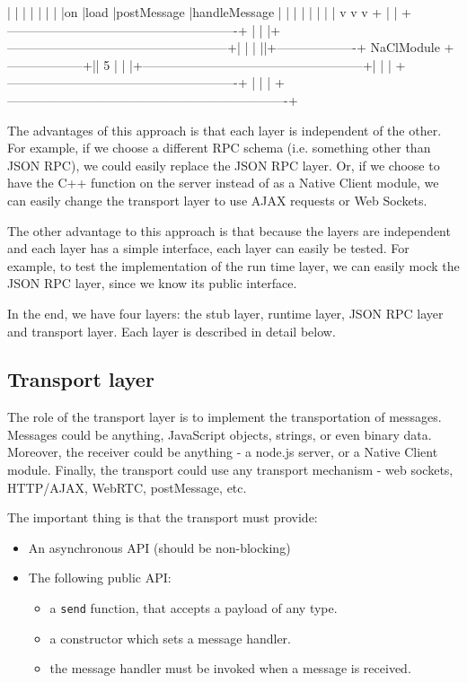 \begin{code}
|         |        |       |                |                       |
|         |on      |load   |postMessage     |handleMessage          |
|         |        |       |                |                       |
|         v        v       v                +                       |
|     +-------------------------------------------------------+     |
|     |+-----------------------------------------------------+|     |
|     ||+-------------------+ NaClModule +------------------+|| 5   |
|     |+-----------------------------------------------------+|     |
|     +-------------------------------------------------------+     |
|                                                                   |
+-------------------------------------------------------------------+
\end{code}

The advantages of this approach is that each layer is independent of the other. For example, if we choose a different RPC schema (i.e. something other than JSON RPC), we could easily replace the JSON RPC layer. Or, if we choose to have the C++ function on the server instead of as a Native Client module, we can easily change the transport layer to use AJAX requests or Web Sockets. 


The other advantage to this approach is that because the layers are independent and each layer has a simple interface, each layer can easily be tested. For example, to test the implementation of the run time layer, we can easily mock the JSON RPC layer, since we know its public interface.

In the end, we have four layers: the stub layer, runtime layer, JSON RPC layer and transport layer. Each layer is described in detail below.

\subsection{Transport layer} %
\label{sub:transport_layer_design}
The role of the transport layer is to implement the transportation of messages. Messages could be anything, JavaScript objects, strings, or even binary data. Moreover, the receiver could be anything - a node.js server, or a Native Client module. Finally, the transport could use any transport mechanism - web sockets, HTTP/AJAX, WebRTC, postMessage, etc.

The important thing is that the transport must provide:
\begin{itemize}
	\item An asynchronous API (should be non-blocking)
	\item The following public API:
	\begin{itemize}
		\item a \lstinline+send+ function, that accepts a payload of any type.
		\item a constructor which sets a message handler.
		\item the message handler must be invoked when a message is received. 
	\end{itemize}
\end{itemize}

